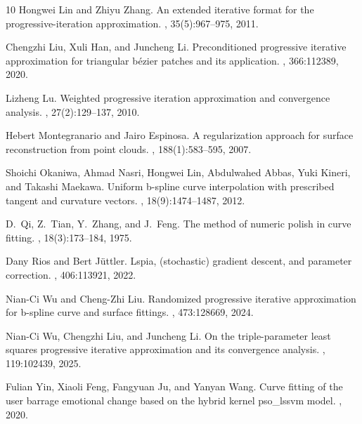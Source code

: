\documentclass[11pt]{article}
\numberwithin{equation}{section}
\begin{document}
\begin{thebibliography}{10}
Hongwei Lin and Zhiyu Zhang.
\newblock An extended iterative format for the progressive-iteration approximation.
, 35(5):967--975, 2011.

Chengzhi Liu, Xuli Han, and Juncheng Li.
\newblock Preconditioned progressive iterative approximation for triangular bézier patches and its application.
, 366:112389, 2020.

Lizheng Lu.
\newblock Weighted progressive iteration approximation and convergence analysis.
, 27(2):129--137, 2010.

Hebert Montegranario and Jairo Espinosa.
\newblock A regularization approach for surface reconstruction from point clouds.
, 188(1):583--595, 2007.

Shoichi Okaniwa, Ahmad Nasri, Hongwei Lin, Abdulwahed Abbas, Yuki Kineri, and Takashi Maekawa.
\newblock Uniform b-spline curve interpolation with prescribed tangent and curvature vectors.
, 18(9):1474--1487, 2012.

D.~Qi, Z.~Tian, Y.~Zhang, and J.~Feng.
\newblock The method of numeric polish in curve fitting.
, 18(3):173--184, 1975.

Dany Rios and Bert Jüttler.
\newblock Lspia, (stochastic) gradient descent, and parameter correction.
, 406:113921, 2022.

Nian-Ci Wu and Cheng-Zhi Liu.
\newblock Randomized progressive iterative approximation for b-spline curve and surface fittings.
, 473:128669, 2024.

Nian-Ci Wu, Chengzhi Liu, and Juncheng Li.
\newblock On the triple-parameter least squares progressive iterative approximation and its convergence analysis.
, 119:102439, 2025.

Fulian Yin, Xiaoli Feng, Fangyuan Ju, and Yanyan Wang.
\newblock Curve fitting of the user barrage emotional change based on the hybrid kernel pso\_lssvm model.
, 2020.


\end{thebibliography}
\end{document}
